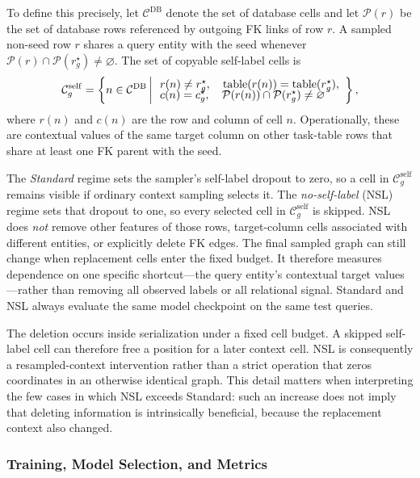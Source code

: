 To define this precisely, let \(\mathcal C^{\mathrm{DB}}\) denote the set of
database cells and let \(\mathcal P(r)\) be the set of database rows
referenced by outgoing FK links of row \(r\). A sampled non-seed row \(r\)
shares a query entity with the seed whenever
\(\mathcal P(r)\cap\mathcal P(r_g^\star)\neq\varnothing\). The set of
copyable self-label cells is
\begin{equation}
  \mathcal C_g^{\mathrm{self}}
  =
  \left\{
    n\in\mathcal C^{\mathrm{DB}}
    \,\middle|\,
    \begin{array}{l}
      r(n)\neq r_g^\star,\quad
      \operatorname{table}(r(n))=\operatorname{table}(r_g^\star),\\[-1mm]
      c(n)=c_g^\star,\quad
      \mathcal P(r(n))\cap\mathcal P(r_g^\star)\neq\varnothing
    \end{array}
  \right\},
\label{eq:exp:self-label-set}
\end{equation}
where \(r(n)\) and \(c(n)\) are the row and column of cell \(n\).
Operationally, these are contextual values of the same target column on
other task-table rows that share at least one FK parent with the seed.

The \emph{Standard} regime sets the sampler's self-label dropout to zero,
so a cell in \(\mathcal C_g^{\mathrm{self}}\) remains visible if ordinary
context sampling selects it. The \emph{no-self-label} (NSL) regime sets
that dropout to one, so every selected cell in
\(\mathcal C_g^{\mathrm{self}}\) is skipped. NSL does \emph{not} remove
other features of those rows, target-column cells associated with different
entities, or explicitly delete FK edges. The final sampled graph can still
change when replacement cells enter the fixed budget. It therefore measures
dependence on one specific shortcut---the query entity's contextual target
values---rather than removing all observed labels or all relational signal.
Standard and NSL always evaluate the same model checkpoint on the same test
queries.

The deletion occurs inside serialization under a fixed cell budget. A
skipped self-label cell can therefore free a position for a later context
cell. NSL is consequently a resampled-context intervention rather than a
strict operation that zeros coordinates in an otherwise identical graph.
This detail matters when interpreting the few cases in which NSL exceeds
Standard: such an increase does not imply that deleting information is
intrinsically beneficial, because the replacement context also changed.

\subsubsection{Training, Model Selection, and Metrics}
\label{sec:exp:optimization}

